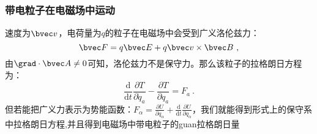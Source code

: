 \subsubsection{带电粒子在电磁场中运动}
速度为$\bvec v$，电荷量为$q$的粒子在电磁场中会受到广义洛伦兹力：
\begin{equation}
\bvec F=q\bvec E+q\bvec v \times \bvec B
~,\end{equation}
由$\grad \cdot \bvec A\neq 0$可知，洛伦兹力不是保守力。那么该粒子的拉格朗日方程为：
\begin{equation}
\frac{\mathrm{d}}{\mathrm{d} t} \frac{\partial T}{\partial \dot{q}_a}-\frac{\partial T}{\partial q_a}=F_a~.
\end{equation}
但若能把广义力表示为势能函数：$F_{\alpha}=\frac{\partial U}{\partial q_{\alpha}}+\frac{\mathrm{d}}{\mathrm{d}t}\frac{\partial U}{\partial q_{\alpha}}$，我们就能得到形式上的保守系中拉格朗日方程,并且得到电磁场中带电粒子的guan拉格朗日量